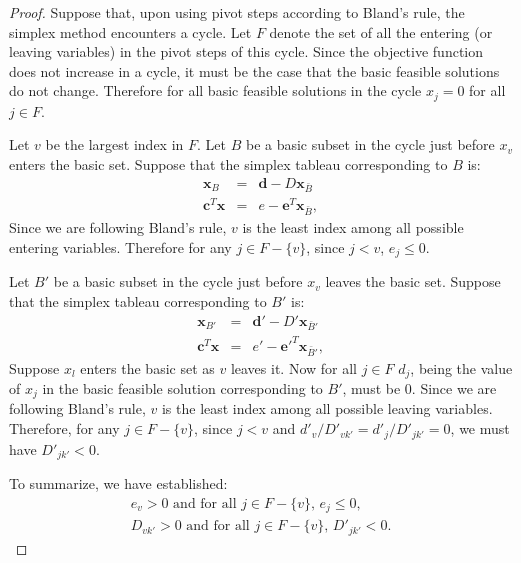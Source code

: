 \documentclass{amsbook}
\newcommand{\xx}{\mathbf x}
\newcommand{\cc}{\mathbf c}
\theoremstyle{definition}
\theoremstyle{remark}
\begin{document}
\begin{proof}
  Suppose that, upon using pivot steps according to Bland's rule, the simplex method encounters a cycle.
  Let $F$ denote the set of all the entering (or leaving variables) in the pivot steps of this cycle.
  Since the objective function does not increase in a cycle, it must be the case that the basic feasible solutions do not change.
  Therefore for all basic feasible solutions in the cycle $x_j=0$ for all $j\in F$.
  
  Let $v$ be the largest index in $F$.
  Let $B$ be a basic subset in the cycle just before $x_v$ enters the basic set.
  Suppose that the simplex tableau corresponding to $B$ is:
  \begin{displaymath}
    \begin{matrix}
      \xx_B & = & \mathbf d - D\xx_{\bar B}\\
      \hline
      \cc^T\xx & = & e - \mathbf e^T \xx_{\bar B},
    \end{matrix}
  \end{displaymath}
  Since we are following Bland's rule, $v$ is the least index among all possible entering variables.
  Therefore for any $j\in F-\{v\}$, since $j<v$, $e_j\leq 0$.

  Let $B'$ be a basic subset in the cycle just before $x_v$ leaves the basic set.
  Suppose that the simplex tableau corresponding to $B'$ is:
  \begin{displaymath}
    \begin{matrix}
      \xx_{B'} & = & \mathbf d' - D'\xx_{\bar B'}\\
      \hline
      \cc^T\xx & = & e' - \mathbf {e'}^T \xx_{\bar B'},
    \end{matrix}
  \end{displaymath}
  Suppose $x_l$ enters the basic set as $v$ leaves it.
  Now for all $j\in F$ $d_j$, being the value of $x_j$ in the basic feasible solution corresponding to $B'$, must be $0$.
  Since we are following Bland's rule, $v$ is the least index among all possible leaving variables.
  Therefore, for any $j\in F-\{v\}$, since $j<v$ and $d'_v/D'_{vk'}=d'_j/D'_{jk'}=0$, we must have $D'_{jk'}<0$.

  To summarize, we have established:
  \begin{gather}
    \label{eq:cycle1}
    \text{$e_v>0$ and for all $j\in F-\{v\}$, $e_j\leq 0$},\\
    \label{eq:cycle2}
    \text{$D_{vk'}>0$ and for all $j\in F-\{v\}$, $D'_{jk'}<0$}.
  \end{gather}


\end{proof}
\end{document}
